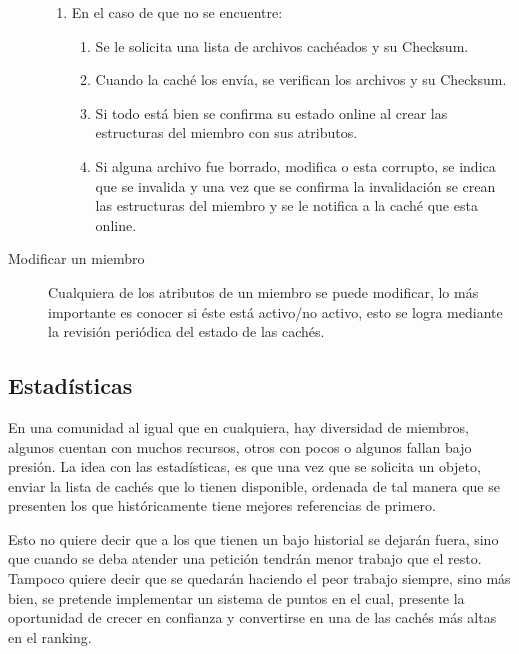 \begin{description}
\begin{enumerate}
	\item En el caso de que no se encuentre:
		\begin{enumerate}
		\item Se le solicita una lista de archivos cachéados y su Checksum.
		\item Cuando la caché los envía, se verifican los archivos y su Checksum.
		\item Si todo está bien se confirma su estado online al crear las estructuras del miembro con sus atributos.
		\item Si alguna archivo fue borrado, modifica o esta corrupto, se indica que se invalida y una vez que se confirma la invalidación se crean las estructuras del miembro y se le notifica a la caché que esta online.
		\end{enumerate}	
	
	\end{enumerate}
	
\item [Modificar un miembro] Cualquiera de los atributos de un miembro se puede modificar, lo más importante es conocer si éste está activo/no activo, esto se logra mediante la  revisión periódica del estado de las cachés.

\end{description}


\subsection{Estadísticas}

En una comunidad al igual que en cualquiera, hay diversidad de miembros, algunos cuentan con muchos recursos, otros con pocos o algunos fallan bajo presión. La idea con las estadísticas, es que una vez que se solicita un objeto, enviar la lista de cachés que lo tienen disponible, ordenada de tal manera que se presenten los que históricamente tiene mejores referencias de primero. 

Esto no quiere decir que a los que tienen un bajo historial se dejarán fuera, sino que cuando se deba atender una petición tendrán menor trabajo que el resto. Tampoco quiere decir que se quedarán haciendo el peor trabajo siempre, sino más bien, se pretende implementar un sistema de puntos en el cual, presente la oportunidad de crecer en confianza y convertirse en una de las cachés más altas en el ranking.

